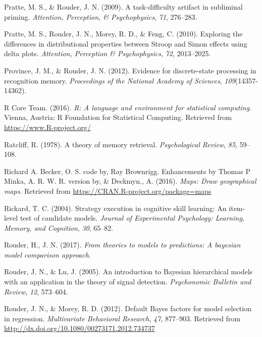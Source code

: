 \documentclass[english,man]{apa6}
\theoremstyle{definition}
\theoremstyle{definition}
\theoremstyle{remark}
\begin{document}
\hypertarget{ref-Pratte:Rouder:2009}{}
Pratte, M. S., \& Rouder, J. N. (2009). A task-difficulty artifact in
subliminal priming. \emph{Attention, Perception, \& Psychophysics},
\emph{71}, 276--283.

\hypertarget{ref-Pratte:etal:2010a}{}
Pratte, M. S., Rouder, J. N., Morey, R. D., \& Feng, C. (2010).
Exploring the differences in distributional properties between Stroop
and Simon effects using delta plots. \emph{Attention, Perception \&
Psychophysics}, \emph{72}, 2013--2025.

\hypertarget{ref-Province:Rouder:2012}{}
Province, J. M., \& Rouder, J. N. (2012). Evidence for discrete-state
processing in recognition memory. \emph{Proceedings of the National
Academy of Sciences}, \emph{109}(14357-14362).

\hypertarget{ref-R-base}{}
R Core Team. (2016). \emph{R: A language and environment for statistical
computing}. Vienna, Austria: R Foundation for Statistical Computing.
Retrieved from \url{https://www.R-project.org/}

\hypertarget{ref-Ratcliff:1978}{}
Ratcliff, R. (1978). A theory of memory retrieval. \emph{Psychological
Review}, \emph{85}, 59--108.

\hypertarget{ref-R-maps}{}
Richard A. Becker, O. S. code by, Ray Brownrigg. Enhancements by Thomas
P Minka, A. R. W. R. version by, \& Deckmyn., A. (2016). \emph{Maps:
Draw geographical maps}. Retrieved from
\url{https://CRAN.R-project.org/package=maps}

\hypertarget{ref-Rickard:2004}{}
Rickard, T. C. (2004). Strategy execution in cognitive skill learning:
An item-level test of candidate models. \emph{Journal of Experimental
Psychology: Learning, Memory, and Cognition}, \emph{30}, 65--82.

\hypertarget{ref-Rouder:etal:2017}{}
Rouder, H., J. N. (2017). \emph{From theories to models to predictions:
A bayesian model comparison approach}.

\hypertarget{ref-Rouder:Lu:2005}{}
Rouder, J. N., \& Lu, J. (2005). An introduction to Bayesian
hierarchical models with an application in the theory of signal
detection. \emph{Psychonomic Bulletin and Review}, \emph{12}, 573--604.

\hypertarget{ref-Rouder:Morey:2012}{}
Rouder, J. N., \& Morey, R. D. (2012). Default Bayes factors for model
selection in regression. \emph{Multivariate Behavioral Research},
\emph{47}, 877--903. Retrieved from
\url{http://dx.doi.org/10.1080/00273171.2012.734737}
\end{document}
